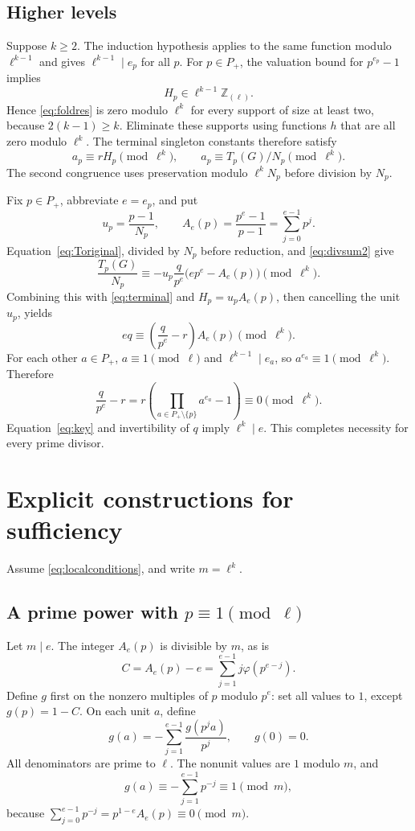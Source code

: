 \documentclass[11pt]{article}
\newcommand{\Rl}{\mathbb Z_{(\ell)}}
\begin{document}
\subsection{Higher levels}
Suppose $k\ge2$. The induction hypothesis applies to the same function modulo $\ell^{k-1}$ and gives $\ell^{k-1}\mid e_p$ for all $p$. For $p\in P_+$, the valuation bound for $p^{e_p}-1$ implies
\[
 H_p\in\ell^{k-1}\Rl.
\]
Hence \eqref{eq:foldres} is zero modulo $\ell^k$ for every support of size at least two, because $2(k-1)\ge k$. Eliminate these supports using functions $h$ that are all zero modulo $\ell^k$. The terminal singleton constants therefore satisfy
\begin{equation}\label{eq:terminal}
 a_p\equiv rH_p\pmod{\ell^k},\qquad
 a_p\equiv T_p(G)/N_p\pmod{\ell^k}.
\end{equation}
The second congruence uses preservation modulo $\ell^kN_p$ before division by $N_p$.

Fix $p\in P_+$, abbreviate $e=e_p$, and put
\[
 u_p=\frac{p-1}{N_p},\qquad A_e(p)=\frac{p^e-1}{p-1}=\sum_{j=0}^{e-1}p^j.
\]
Equation~\eqref{eq:Toriginal}, divided by $N_p$ before reduction, and \eqref{eq:divsum2} give
\[
 \frac{T_p(G)}{N_p}
 \equiv-u_p\frac q{p^e}\bigl(ep^e-A_e(p)\bigr)\pmod{\ell^k}.
\]
Combining this with \eqref{eq:terminal} and $H_p=u_pA_e(p)$, then cancelling the unit $u_p$, yields
\begin{equation}\label{eq:key}
 e q\equiv\left(\frac q{p^e}-r\right)A_e(p)\pmod{\ell^k}.
\end{equation}
For each other $a\in P_+$, $a\equiv1\pmod\ell$ and $\ell^{k-1}\mid e_a$, so $a^{e_a}\equiv1\pmod{\ell^k}$. Therefore
\[
 \frac q{p^e}-r=r\left(\prod_{a\in P_+\setminus\{p\}}a^{e_a}-1\right)
 \equiv0\pmod{\ell^k}.
\]
Equation~\eqref{eq:key} and invertibility of $q$ imply $\ell^k\mid e$. This completes necessity for every prime divisor.

\section{Explicit constructions for sufficiency}
Assume \eqref{eq:localconditions}, and write $m=\ell^k$.

\subsection{A prime power with $p\equiv1\pmod\ell$}
Let $m\mid e$. The integer $A_e(p)$ is divisible by $m$, as is
\[
 C=A_e(p)-e=\sum_{j=1}^{e-1}j\varphi(p^{e-j}).
\]
Define $g$ first on the nonzero multiples of $p$ modulo $p^e$: set all values to $1$, except $g(p)=1-C$. On each unit $a$, define
\begin{equation}\label{eq:primeconstruct}
 g(a)=-\sum_{j=1}^{e-1}\frac{g(p^ja)}{p^j},\qquad g(0)=0.
\end{equation}
All denominators are prime to $\ell$. The nonunit values are $1$ modulo $m$, and
\[
 g(a)\equiv-\sum_{j=1}^{e-1}p^{-j}\equiv1\pmod m,
\]
because $\sum_{j=0}^{e-1}p^{-j}=p^{1-e}A_e(p)\equiv0\pmod m$.
\end{document}
